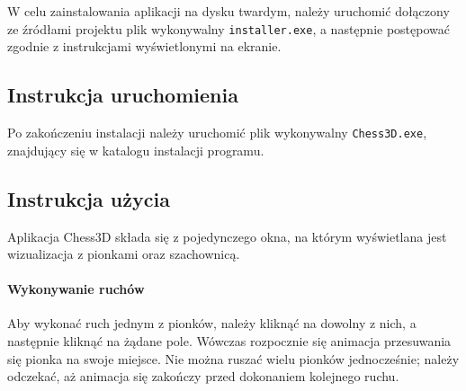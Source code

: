 \documentclass[10pt,a4paper]{article}
\begin{document}
W celu zainstalowania aplikacji na dysku twardym, należy uruchomić dołączony ze źródłami projektu plik wykonywalny \texttt{installer.exe}, a następnie postępować zgodnie z instrukcjami wyświetlonymi na ekranie.

\subsection{Instrukcja uruchomienia}

Po zakończeniu instalacji należy uruchomić plik wykonywalny \texttt{Chess3D.exe}, znajdujący się w katalogu instalacji programu.

\subsection{Instrukcja użycia}

Aplikacja Chess3D składa się z pojedynczego okna, na którym wyświetlana jest wizualizacja z pionkami oraz szachownicą.

\paragraph{Wykonywanie ruchów}
Aby wykonać ruch jednym z pionków, należy kliknąć na dowolny z nich, a następnie kliknąć na żądane pole. Wówczas rozpocznie się animacja przesuwania się pionka na swoje miejsce. Nie można ruszać wielu pionków jednocześnie; należy odczekać, aż animacja się zakończy przed dokonaniem kolejnego ruchu.
\end{document}

